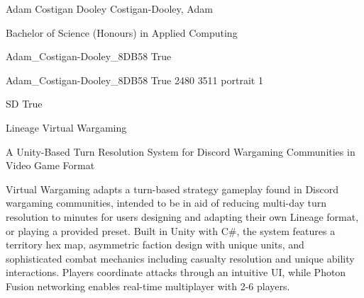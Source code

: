 \documentclass[twoside]{report}
\begin{document}
\begingroup{}\relax



\def\Key{Adam_Costigan-Dooley_8DB58}

{Adam Costigan Dooley}
{Costigan-Dooley, Adam}

{Bachelor of Science (Honours) in Applied Computing}

{Adam_Costigan-Dooley_8DB58}
{True}

{Adam_Costigan-Dooley_8DB58}
{True}
{2480}
{3511}
{portrait}
{1}

{SD}
{True}

{Lineage Virtual Wargaming}

{A Unity-Based Turn Resolution System for Discord Wargaming Communities in Video Game Format}

{Virtual Wargaming adapts a turn-based strategy gameplay found in Discord wargaming communities, intended to be in aid of reducing multi-day turn resolution to minutes for users designing and adapting their own Lineage format, or playing a provided preset. Built in Unity with C\#, the system features a territory hex map, asymmetric faction design with unique units, and sophisticated combat mechanics including casualty resolution and unique ability interactions. Players coordinate attacks through an intuitive UI, while Photon Fusion networking enables real-time multiplayer with 2-6 players.}
\end{document}
